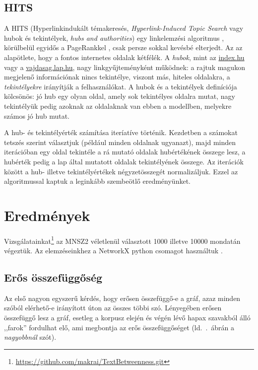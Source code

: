 \documentclass{llncs}
\begin{document}
\subsection{HITS}

A HITS (Hyperlinkindukált témakeresés, \emph{Hyperlink-Induced Topic Search}
vagy hubok és tekintélyek, \emph{hubs and authorities}) egy linkelemzési
algoritmus \cite{Kleinberg:1999},
körülbelül egyidős a PageRankkel \cite{page1999pagerank}, csak persze sokkal
kevésbé elterjedt.
Az az alapötlete, hogy a fontos internetes oldalak kétfélék.  A \emph{hubok},
mint az \href{https://index.hu/}{index.hu} vagy a
\href{https://vajdasag.lap.hu/}{vajdasag.lap.hu}, nagy linkgyűjteményként
működnek: a rajtuk magukon megjelenő információnak nincs tekintélye, viszont
más, hiteles oldalakra, a \emph{tekintélyekre} irányítják a felhasználókat. A
hubok és a tekintélyek definíciója kölcsönös: jó hub egy olyan oldal, amely sok
tekintélyes oldalra mutat, nagy tekintélyük pedig azoknak az oldalaknak van
ebben a modellben, melyekre számos jó hub mutat.

A hub- és tekintélyérték számítása iteríatíve történik.  Kezdetben a számokat
tetszés szerint választjuk (például minden oldalnak ugyanazt), majd minden
iterációban egy oldal tekintéle a rá mutató oldalak hubértékének összege
lesz, a hubérték pedig a lap által mutatott oldalak tekintélyének összege.  Az
iterációk között a hub- illetve tekintélyértékek négyzetösszegét normalizáljuk.
Ezzel az algoritmussal kaptuk a leginkább szembeötlő eredményünket.

\section{Eredmények}
\label{sec:results}

Vizsgálatainkat\footnote{\url{https://github.com/makrai/TextBetweenness.git}}
az MNSZ2 \cite{oravecz2014hungarian} véletlenül választott 1000 illetve 10000
mondatán végeztük.
%
Az elemzéseinkhez a NetworkX python csomagot használtuk
\cite{hagberg2008exploring}.



\subsection{Erős összefüggőség}
Az első nagyon egyszerű kérdés, hogy erősen összefüggő-e a gráf,
azaz minden szóból elérhető-e irányított úton az összes többi szó.
Lényegében erősen összefüggő lesz a gráf,
esetleg a korpusz elején és végén lévő
hapax szavakból álló ,,farok'' fordulhat elő,
ami megbontja az erős összefüggőséget
(ld.\ .\ ábrán a \emph{nagyobbnál} szót).
\end{document}
